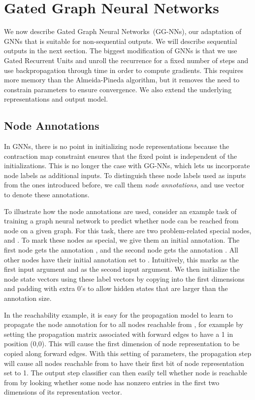 \documentclass{article} \usepackage{iclr2016_conference,times}
\newcommand{\OurMethodMinor}{Gated Graph Neural Network}
\newcommand{\OurMethodMinors}{\OurMethodMinor s}
\newcommand{\OurMethodMinorShort}{GG-NN}
\newcommand{\OurMethodMinorShorts}{\OurMethodMinorShort s}
\begin{document}
\section{\OurMethodMinors}

We now describe \OurMethodMinors~(\OurMethodMinorShorts), our
adaptation of GNNs that is suitable for non-sequential outputs. We
will describe sequential outputs in the next section. The biggest
modification of GNNs is that we use Gated Recurrent Units
\citep{cho2014learning} and unroll the recurrence for a fixed number of steps  and use
backpropagation through time in order to compute gradients. This
requires more memory than the Almeida-Pineda algorithm, but it removes
the need to constrain parameters to ensure convergence. We also
extend the underlying representations and output model.

\subsection{Node Annotations}

In GNNs,
there is no point in initializing node representations because the
contraction map constraint ensures that the fixed point is independent
of the initializations. This is no longer the case with \OurMethodMinorShorts,
which lets us incorporate node labels as additional inputs. To distinguish
these node labels used as inputs from the ones introduced before, we call them
\emph{node annotations}, and use vector  to denote these
annotations. 



To illustrate how the node annotations are used, consider an example task of
training a graph neural network to predict whether
node  can be reached from node  on a given graph.  For this task,
there are two problem-related special nodes,  and . To mark these nodes
as special, we give them an initial annotation. The first node  gets the
annotation , and the second node  gets the annotation
. All other nodes  have their initial annotation set to
. Intuitively, this marks  as the first input argument and  as the second input argument.
We then initialize the node state vectors  using these label vectors
by copying  into the first dimensions and padding with extra 0's to allow hidden states that are larger than the annotation size.

In the reachability example, it is easy for the propagation model to learn to propagate the node annotation
for  to all nodes reachable from , for example by setting the propagation matrix associated with forward edges to have a 1 in position (0,0). This will cause the first dimension of node representation to be copied along forward edges.
With this setting of parameters, the propagation step will cause all nodes
reachable from  to have their first bit of node representation set to 1.
The output step classifier can then easily tell whether node  is reachable from  by looking whether some node has nonzero entries in the first two dimensions of its representation vector.
\end{document}
